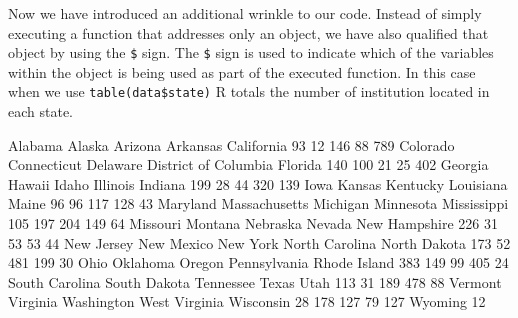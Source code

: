 \documentclass{article}
\newenvironment{Schunk}{}{}
\newcommand{\code}[1]{\texttt{#1}}
\newcommand{\proglang}[1]{\textsf{#1}}
\begin{document}
{\begin{enumerate}[leftmargin=15mm]
\begin{Schunk}
\end{Schunk}

Now we have introduced an additional wrinkle to our  code.  Instead of simply executing a function that addresses only an object, we have also qualified that object by using the \code{\$} sign.  The \code{\$} sign is used to indicate which of the variables within the object is being used as part of the executed function.  In this case when we use \code{table(data\$state)} \proglang{R} totals the number of institution located in each state.

\begin{Schunk}
\begin{Sinput}
             Alabama               Alaska              Arizona             Arkansas           California 
                  93                   12                  146                   88                  789 
            Colorado          Connecticut             Delaware District of Columbia              Florida 
                 140                  100                   21                   25                  402 
             Georgia               Hawaii                Idaho             Illinois              Indiana 
                 199                   28                   44                  320                  139 
                Iowa               Kansas             Kentucky            Louisiana                Maine 
                  96                   96                  117                  128                   43 
            Maryland        Massachusetts             Michigan            Minnesota          Mississippi 
                 105                  197                  204                  149                   64 
            Missouri              Montana             Nebraska               Nevada        New Hampshire 
                 226                   31                   53                   53                   44 
          New Jersey           New Mexico             New York       North Carolina         North Dakota 
                 173                   52                  481                  199                   30 
                Ohio             Oklahoma               Oregon         Pennsylvania         Rhode Island 
                 383                  149                   99                  405                   24 
      South Carolina         South Dakota            Tennessee                Texas                 Utah 
                 113                   31                  189                  478                   88 
             Vermont             Virginia           Washington        West Virginia            Wisconsin 
                  28                  178                  127                   79                  127 
             Wyoming 
                  12
\end{Sinput}
\end{Schunk}


\end{enumerate}}
\end{document}
